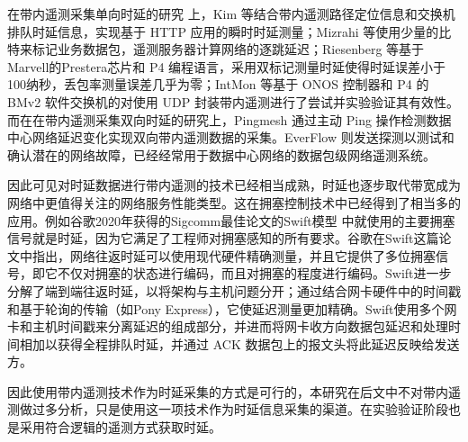 在带内遥测采集单向时延的研究 \cite{INTSURVEY} 上，Kim \cite{KIM} 等结合带内遥测路径定位信息和交换机排队时延信息，实现基于 \gls*{HTTP} 应用的瞬时时延测量；Mizrahi \cite{MIZRAHI} 等使用少量的比特来标记业务数据包，遥测服务器计算网络的逐跳延迟；Riesenberg \cite{INTRIE} 等基于Marvell的Prestera芯片和 \gls*{P4} 编程语言，采用双标记测量时延使得时延误差小于100纳秒，丢包率测量误差几乎为零；IntMon \cite{INTMON} 等基于 \gls*{ONOS} 控制器和 \gls*{P4} 的 \gls*{BMv2} 软件交换机的对使用 \gls*{UDP} 封装带内遥测进行了尝试并实验验证其有效性。而在在带内遥测采集双向时延的研究上，Pingmesh \cite{PINGMASH} 通过主动 \gls*{Ping} 操作检测数据中心网络延迟变化实现双向带内遥测数据的采集。EverFlow \cite{EVERFLOW} 则发送探测以测试和确认潜在的网络故障，已经经常用于数据中心网络的数据包级网络遥测系统。

因此可见对时延数据进行带内遥测的技术已经相当成熟，时延也逐步取代带宽成为网络中更值得关注的网络服务性能类型。这在拥塞控制技术中已经得到了相当多的应用。例如谷歌2020年获得的Sigcomm最佳论文的Swift模型 \cite{SWIFT} 中就使用的主要拥塞信号就是时延，因为它满足了工程师对拥塞感知的所有要求。谷歌在Swift这篇论文中指出，网络往返时延可以使用现代硬件精确测量，并且它提供了多位拥塞信号，即它不仅对拥塞的状态进行编码，而且对拥塞的程度进行编码。Swift进一步分解了端到端往返时延，以将架构与主机问题分开；通过结合网卡硬件中的时间戳和基于轮询的传输（如Pony Express），它使延迟测量更加精确。Swift使用多个网卡和主机时间戳来分离延迟的组成部分，并进而将网卡收方向数据包延迟和处理时间相加以获得全程排队时延，并通过 \gls*{ACK} 数据包上的报文头将此延迟反映给发送方。

因此使用带内遥测技术作为时延采集的方式是可行的，本研究在后文中不对带内遥测做过多分析，只是使用这一项技术作为时延信息采集的渠道。在实验验证阶段也是采用符合逻辑的遥测方式获取时延。


\ifx\usechapbib\empty
\nocite{BSTcontrol}
\setcounter{NAT@ctr}{0}


\fi
